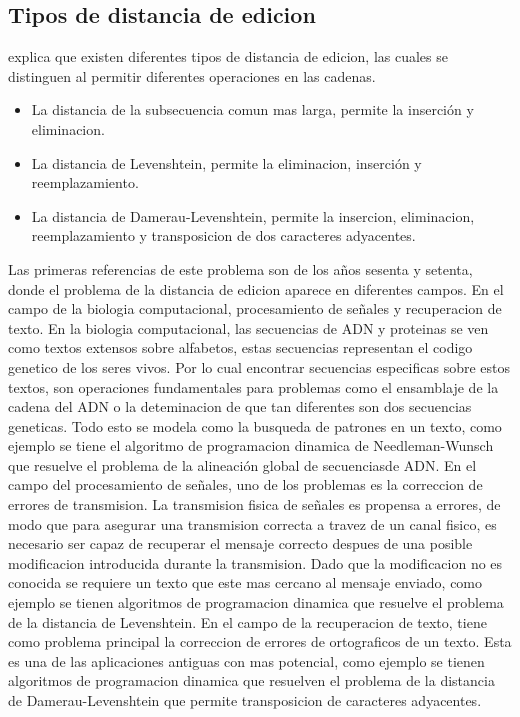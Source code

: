 \subsection{Tipos de distancia de edicion}
\cite{Navarro2001} explica que existen diferentes tipos de distancia de edicion, las cuales se distinguen al permitir diferentes operaciones en las cadenas.
\begin{itemize}
  \item La distancia de la subsecuencia comun mas larga, permite la inserción y eliminacion.
  \item La distancia de Levenshtein, permite la eliminacion, inserción y reemplazamiento.
  \item La distancia de Damerau-Levenshtein, permite la insercion, eliminacion, reemplazamiento y transposicion de dos caracteres adyacentes.
\end{itemize}
Las primeras referencias de este problema son de los años sesenta y setenta, donde el problema de la distancia de edicion aparece en diferentes campos. En el campo de la biologia computacional, procesamiento de señales y recuperacion de texto. En la biologia computacional, las secuencias de ADN y proteinas se ven como textos extensos sobre alfabetos, estas secuencias representan el codigo genetico de los seres vivos. Por lo cual encontrar secuencias especificas sobre estos textos, son operaciones fundamentales para problemas como el ensamblaje de la cadena del ADN o la deteminacion de que tan diferentes son dos secuencias geneticas. Todo esto se modela como la busqueda de patrones en un texto, como ejemplo se tiene el algoritmo de programacion dinamica de Needleman-Wunsch que resuelve el problema de la alineación global de secuenciasde ADN. En el campo del procesamiento de señales, uno de los problemas es la correccion de errores de transmision. La transmision fisica de señales es propensa a errores, de modo que para asegurar una transmision correcta a travez de un canal fisico, es necesario ser capaz de recuperar el mensaje correcto despues de una posible modificacion introducida durante la transmision. Dado que la modificacion no es conocida se requiere un texto que este mas cercano al mensaje enviado, como ejemplo se tienen algoritmos de programacion dinamica que resuelve el problema de la distancia de Levenshtein. En el campo de la recuperacion de texto, tiene como problema principal la correccion de errores de ortograficos de un texto. Esta es una de las aplicaciones antiguas con mas potencial, como ejemplo se tienen algoritmos de programacion dinamica que resuelven el problema de la distancia de Damerau-Levenshtein que permite transposicion de caracteres adyacentes.

